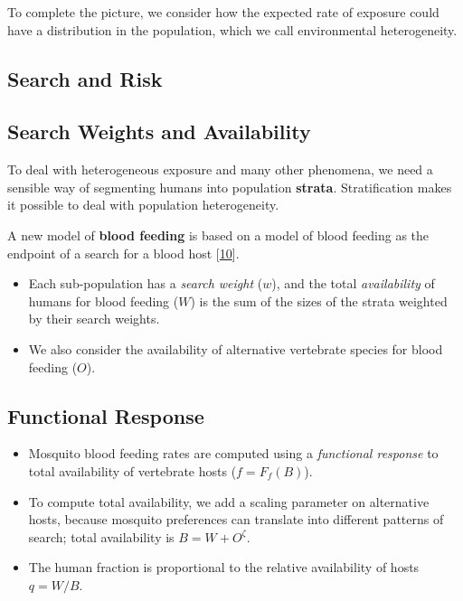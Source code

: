 \documentclass[
]{book}
\begin{document}
To complete the picture, we consider how the expected rate of exposure could have a distribution in the population, which we call environmental heterogeneity.

\hypertarget{search-and-risk}{%
\subsection{Search and Risk}\label{search-and-risk}}

\hypertarget{search-weights-and-availability}{%
\subsection{Search Weights and Availability}\label{search-weights-and-availability}}

To deal with heterogeneous exposure and many other phenomena, we need a sensible way of segmenting humans into population \textbf{strata}. Stratification makes it possible to deal with population heterogeneity.

A new model of \textbf{blood feeding} is based on a model of blood feeding as the endpoint of a search for a blood host {[}\protect\hyperlink{ref-WuSL2022SpatialDynamics}{10}{]}.

\begin{itemize}
\item
  Each sub-population has a \emph{search weight} (\(w\)), and the total \emph{availability} of humans for blood feeding (\(W\)) is the sum of the sizes of the strata weighted by their search weights.
\item
  We also consider the availability of alternative vertebrate species for blood feeding (\(O\)).
\end{itemize}

\hypertarget{functional-response}{%
\subsection{Functional Response}\label{functional-response}}

\begin{itemize}
\item
  Mosquito blood feeding rates are computed using a \emph{functional response} to total availability of vertebrate hosts (\(f = F_f(B)\)).
\item
  To compute total availability, we add a scaling parameter on alternative hosts, because mosquito preferences can translate into different patterns of search; total availability is \(B=W + O^\zeta\).
\item
  The human fraction is proportional to the relative availability of hosts \(q = W/B\).
\end{itemize}
\end{document}
